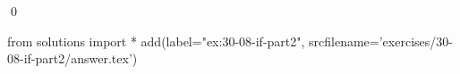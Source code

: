 
\begin{ex}
  \label{ex:30-08-if-part2}
  
  \qed
\end{ex}
\begin{python0}
from solutions import *
add(label="ex:30-08-if-part2",
    srcfilename='exercises/30-08-if-part2/answer.tex')
\end{python0}
